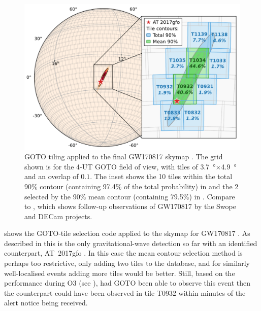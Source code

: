 \begin{colsection}
\begin{figure}[t]
    \begin{center}
        \includegraphics[width=\linewidth]{images/tiling/170817.pdf}
    \end{center}
    \caption[GOTO tile probabilities for GW170817]{
        GOTO tiling applied to the final GW170817 skymap \citep{GW170817}.
        The grid shown is for the 4-UT GOTO field of view, with tiles of \SI{3.7}{\degree}$\times$\SI{4.9}{\degree} and an overlap of $0.1$. The inset shows the 10 tiles within the total 90\% contour (containing 97.4\% of the total probability) in  and the 2 selected by the 90\% mean contour (containing 79.5\%) in . Compare to , which shows follow-up observations of GW170817 by the Swope and DECam projects.
    }\label{fig:170817_gw}
\end{figure}

 shows the GOTO-tile selection code applied to the skymap for GW170817 \citep{GW170817}. As described in  this is the only gravitational-wave detection so far with an identified counterpart, AT~2017gfo \citep{GW170817_followup}. In this case the mean contour selection method is perhaps too restrictive, only adding two tiles to the database, and for similarly well-localised events adding more tiles would be better. Still, based on the performance during O3 (see ), had GOTO been able to observe this event then the counterpart could have been observed in tile T0932 within minutes of the alert notice being received.

\end{colsection}

